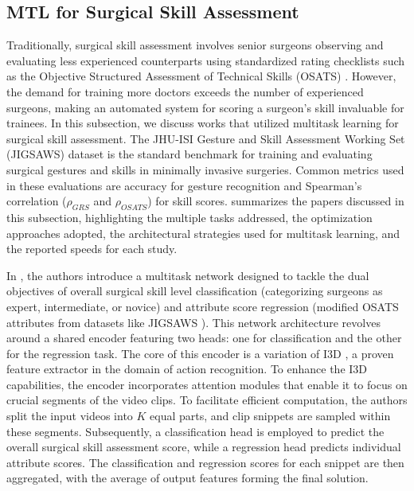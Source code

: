\subsection{MTL for Surgical Skill Assessment}

Traditionally, surgical skill assessment involves senior surgeons observing and evaluating less experienced counterparts using standardized rating checklists such as the Objective Structured Assessment of Technical Skills (OSATS) \citep{osats}. However, the demand for training more doctors exceeds the number of experienced surgeons, making an automated system for scoring a surgeon's skill invaluable for trainees.
In this subsection, we discuss works that utilized multitask learning for surgical skill assessment. The JHU-ISI Gesture and Skill Assessment Working Set (JIGSAWS) dataset \citep{jigsaws} is the standard benchmark for training and evaluating surgical gestures and skills \cite{lam2022machine} in minimally invasive surgeries. Common metrics used in these evaluations are accuracy for gesture recognition and Spearman's correlation ($\rho_{GRS}$ and $\rho_{OSATS}$) for skill scores.
 summarizes the papers discussed in this subsection, highlighting the multiple tasks addressed, the optimization approaches adopted, the architectural strategies used for multitask learning, and the reported speeds for each study.  



In \citet{jian2020multitask}, the authors introduce a multitask network designed to tackle the dual objectives of overall surgical skill level classification (categorizing surgeons as expert, intermediate, or novice) and attribute score regression (modified OSATS attributes from datasets like JIGSAWS \citep{jigsaws}). This network architecture revolves around a shared encoder featuring two heads: one for classification and the other for the regression task. The core of this encoder is a variation of  I3D \citep{carreira2017quo}, a proven feature extractor in the domain of action recognition. To enhance the I3D capabilities, the encoder incorporates attention modules that enable it to focus on crucial segments of the video clips.
To facilitate efficient computation, the authors split the input videos into $K$ equal parts, and clip snippets are sampled within these segments.  Subsequently, a classification head is employed to predict the overall surgical skill assessment score, while a regression head predicts individual attribute scores. The classification and regression scores for each snippet are then aggregated, with the average of output features forming the final solution.

